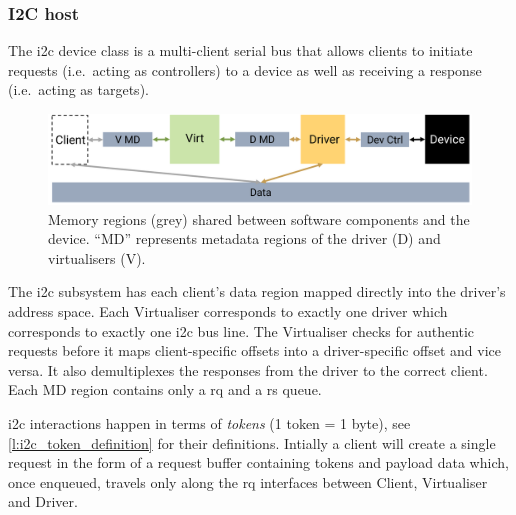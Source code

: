 \documentclass[a4paper,12pt]{report}
\newcommand{\figscale}{0.2}
\begin{document}
\subsubsection{I2C host}\label{s:cl-i2c}

The \gls{i2c} device class is a multi-client serial bus that allows
clients to initiate
requests (i.e.\ acting as controllers) to a device as well as receiving a response (i.e.\
acting as targets).

\begin{figure}[th]
  \centering
  \includegraphics[scale=\figscale]{i2c}
  \caption[Memory regions shared between software components
    and the device.]{Memory regions (grey) shared between software components
    and the device. ``MD'' represents metadata regions of the driver (D) and virtualisers (V).}
  \label{f:i2c_diagram}
\end{figure}

The \gls{i2c} subsystem has each client's data region mapped directly into the driver's address space.
Each Virtualiser corresponds to exactly one driver which corresponds to exactly one \gls{i2c} bus line.
The Virtualiser checks for authentic requests before it maps client-specific offsets into a driver-specific offset and vice versa.
It also demultiplexes the responses from the driver to the correct client.
Each MD region contains only a \gls{rq} and a \gls{rs} queue.

\gls{i2c} interactions happen in terms of \emph{tokens} (1 token = 1 byte), see
\autoref{l:i2c_token_definition} for their definitions.
Intially a client will create a single request in the form of a request buffer containing tokens
and payload data which, once enqueued, travels only along the \gls{rq} interfaces between Client, Virtualiser and Driver.
\end{document}
